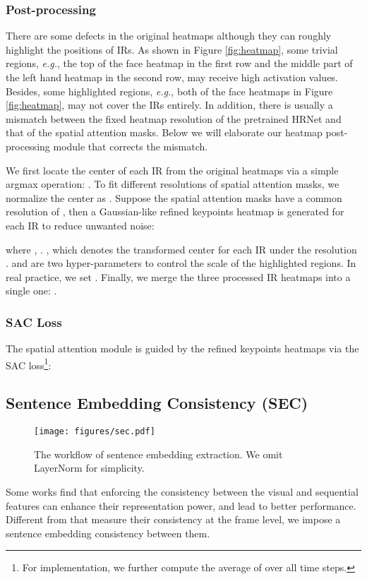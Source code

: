 \documentclass[acmsmall,screen]{acmart}
\def\eg{\emph{e.g.}} \def\Eg{\emph{E.g.}}
\begin{document}
\subsubsection{Post-processing}
\label{sec:post-process}
There are some defects in the original heatmaps although they can roughly highlight the positions of IRs.
As shown in Figure \ref{fig:heatmap}, some trivial regions, \eg, the top of the face heatmap in the first row and the middle part of the left hand heatmap in the second row, may receive high activation values.
Besides, some highlighted regions, \eg, both of the face heatmaps in Figure \ref{fig:heatmap}, may not cover the IRs entirely.
In addition, there is usually a mismatch between the fixed heatmap resolution of the pretrained HRNet and that of the spatial attention masks.
Below we will elaborate our heatmap post-processing module that corrects the mismatch.

We first locate the center of each IR from the original heatmaps via a simple argmax operation: .
To fit different resolutions of spatial attention masks, we normalize the center as .
Suppose the spatial attention masks have a common resolution of , then a Gaussian-like refined keypoints heatmap is generated for each IR to reduce unwanted noise:

where , . 
, which denotes the transformed center for each IR under the resolution .
 and  are two hyper-parameters to control the scale of the highlighted regions.
In real practice, we set .
Finally, we merge the three processed IR heatmaps into a single one: .

\subsubsection{SAC Loss}
The spatial attention module is guided by the refined keypoints heatmaps via the SAC loss\footnote{For implementation, we further compute the average of  over all time steps.}:



\subsection{Sentence Embedding Consistency (SEC)}
\begin{figure}[t]
  \centering
  \texttt{[image: figures/sec.pdf]}
  \caption{The workflow of sentence embedding extraction. We omit LayerNorm \cite{layernorm} for simplicity.}
  \label{fig:sec}
\end{figure}
Some works \cite{vac, self-mutual} find that enforcing the consistency between the visual and sequential features can enhance their representation power, and lead to better performance.
Different from \cite{vac, self-mutual} that measure their consistency at the frame level, we impose a sentence embedding consistency between them.
\end{document}
